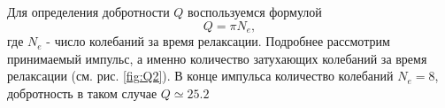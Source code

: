 Для определения добротности $Q$ воспользуемся формулой 
\begin{equation}
	Q = \pi N_e,
	\label{eq:dobr}
\end{equation}
где $N_e$ - число колебаний за время релаксации. Подробнее рассмотрим принимаемый импульс, а именно количество затухающих
колебаний за время релаксации (см. рис. \ref{fig:Q2}). В конце импульса количество колебаний $N_e = 8$, добротность
в таком случае $Q \simeq 25.2$



